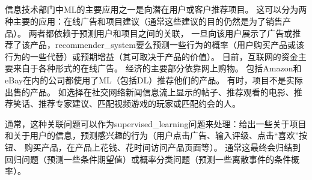 \subsection{}
\label{sec:recommender_systems}
信息技术部门中\gls{ML}的主要应用之一是向潜在用户或客户推荐项目。
这可以分为两种主要的应用：在线广告和项目建议（通常这些建议的目的仍然是为了销售产品）。
两者都依赖于预测用户和项目之间的关联， 一旦向该用户展示了广告或推荐了该产品，\gls{recommender_system}要么预测一些行为的概率（用户购买产品或该行为的一些代替）或预期增益（其可取决于产品的价值）。
目前，互联网的资金主要来自于各种形式的在线广告。
经济的主要部分依靠网上购物。 
包括Amazon和eBay在内的公司都使用了\gls{ML}（包括\gls{DL}）推荐他们的产品。
有时，项目不是实际出售的产品。
如选择在社交网络新闻信息流上显示的帖子、推荐观看的电影、推荐笑话、推荐专家建议、匹配视频游戏的玩家或匹配约会的人。

通常，这种关联问题可以作为\gls{supervised_learning}问题来处理：给出一些关于项目和关于用户的信息，预测感兴趣的行为（用户点击广告、输入评级、点击``喜欢''按钮、 购买产品，在产品上花钱、花时间访问产品页面等）。
通常这最终会归结到回归问题（预测一些条件期望值）或概率分类问题（预测一些离散事件的条件概率）。

